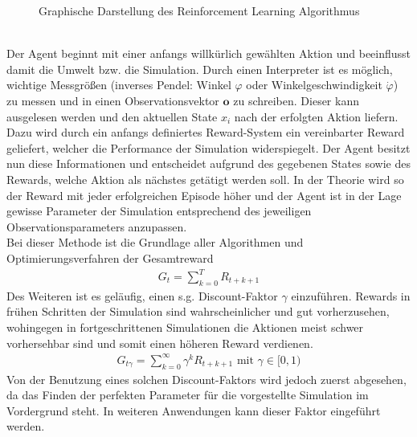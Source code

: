 	\begin{figure}[!h] %
		\centering
		\def\svgwidth{12cm}
		
		\caption{Graphische Darstellung des Reinforcement Learning Algorithmus}
		\label{fig:rl_chart}
	\end{figure}\\
	Der Agent beginnt mit einer anfangs willkürlich gewählten Aktion und beeinflusst damit die Umwelt bzw. die Simulation. Durch einen Interpreter ist es möglich, wichtige Messgrößen (inverses Pendel: Winkel $\varphi$ oder Winkelgeschwindigkeit $\dot{\varphi}$) zu messen und in einen Observationsvektor $\textbf{o}$ zu schreiben. Dieser kann ausgelesen werden und den aktuellen State $x_i$ nach der erfolgten Aktion liefern. Dazu wird durch ein anfangs definiertes Reward-System ein vereinbarter Reward geliefert, welcher die Performance der Simulation widerspiegelt. Der Agent besitzt nun diese Informationen und entscheidet aufgrund des gegebenen States sowie des Rewards, welche Aktion als nächstes getätigt werden soll. In der Theorie wird so der Reward mit jeder erfolgreichen Episode höher und der Agent ist in der Lage gewisse Parameter der Simulation entsprechend des jeweiligen Observationsparameters anzupassen.\\
	Bei dieser Methode ist die Grundlage aller Algorithmen und Optimierungsverfahren der Gesamtreward
	\begin{align}
		G_t = \sum_{k=0}^{T}R_{t+k+1}
	\end{align}
	Des Weiteren ist es geläufig, einen s.g. \glqq Discount-Faktor\grqq{} $\gamma$ einzuführen. Rewards in frühen Schritten der Simulation sind wahrscheinlicher und gut vorherzusehen, wohingegen in fortgeschrittenen Simulationen die Aktionen meist schwer vorhersehbar sind und somit einen höheren Reward verdienen.
	\begin{align}
		G_{t\gamma} = \sum_{k=0}^{\infty}\gamma^k R_{t+k+1}\text{ mit }\gamma\in[0,1)
	\end{align}
	Von der Benutzung eines solchen Discount-Faktors wird jedoch zuerst abgesehen, da das Finden der perfekten Parameter für die vorgestellte Simulation im Vordergrund steht. In weiteren Anwendungen kann dieser Faktor eingeführt werden.
	
	
